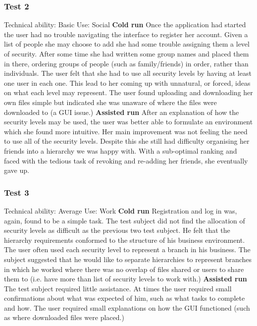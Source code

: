 \documentclass[12pt, titlepage]{article}
\begin{document}
\subsubsection{Test 2}
Technical ability: Basic
\newline Use: Social
\newline
\newline \textbf{Cold run}
\newline Once the application had started the user had no trouble navigating the interface to register her account. Given a list of people she may choose to add she had some trouble assigning them a level of security. After some time she had written some group names and placed them in there, ordering groups of people (such as family/friends) in order, rather than individuals. The user felt that she had to use all security levels by having at least one user in each one. This lead to her coming up with unnatural, or forced, ideas on what each level may represent.
\newline \indent The user found uploading and downloading her own files simple but indicated she was unaware of where the files were downloaded to (a GUI issue.)
\newline
\newline \textbf{Assisted run}
\newline After an explanation of how the security levels may be used, the user was better able to formulate an environment which she found more intuitive. Her main improvement was not feeling the need to use all of the security levels. Despite this she still had difficulty organising her friends into a hierarchy we was happy with. With a sub-optimal ranking and faced with the tedious task of revoking and re-adding her friends, she eventually gave up.

\subsubsection{Test 3}
Technical ability: Average
\newline Use: Work
\newline
\newline \textbf{Cold run}
\newline Registration and log in was, again, found to be a simple task. The test subject did not find the allocation of security levels as difficult as the previous two test subject. He felt that the hierarchy requirements conformed to the structure of his business environment. The user often used each security level to represent a branch in his business. The subject suggested that he would like to separate hierarchies to represent branches in which he worked where there was no overlap of files shared or users to share them to (i.e. have more than list of security levels to work with.)
\newline \textbf{Assisted run}
\newline The test subject required little assistance. At times the user required small confirmations about what was expected of him, such as what tasks to complete and how. The user required small explanations on how the GUI functioned (such as where downloaded files were placed.) 
\end{document}
